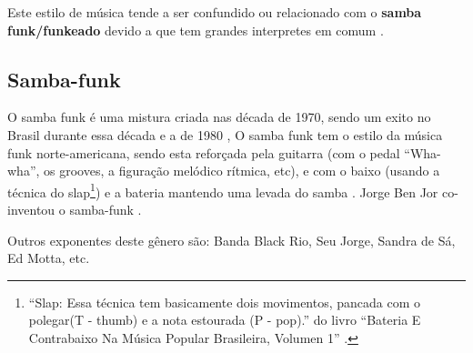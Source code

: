 Este estilo de música tende a ser confundido ou relacionado com o \textbf{samba funk/funkeado} 
devido a que tem grandes interpretes em comum \cite[pp. 36]{montanhaurbateria} \cite[pp. 131]{perna2002samba}.


\subsection{Samba-funk}
O samba funk é uma mistura criada nas década de 1970, 
sendo um exito no Brasil durante essa década e a de 1980
\cite[pp. 36]{montanhaurbateria} \cite[pp. 11]{medeiros2012brazilian}, 
O samba funk tem o estilo da música funk norte-americana, 
sendo esta  reforçada pela guitarra 
(com o pedal ``Wha-wha'', os grooves, a figuração melódico rítmica, etc), e com
o baixo (usando a técnica do slap\footnote{``Slap: Essa técnica tem basicamente dois movimentos, 
pancada com o polegar(T - thumb) e a nota estourada (P - pop).'' do livro 
``Bateria E Contrabaixo Na Música Popular Brasileira, Volumen 1'' \cite[pp. 36]{montanhaurbateria}.}) 
e a bateria mantendo uma levada do samba \cite[pp. 11]{medeiros2012brazilian}.
Jorge Ben Jor co-inventou o samba-funk \cite[pp. 166]{sanches2000tropicalismo}.


Outros exponentes deste gênero são: 
Banda Black Rio,
Seu Jorge,
Sandra de Sá,
Ed Motta,
etc.



